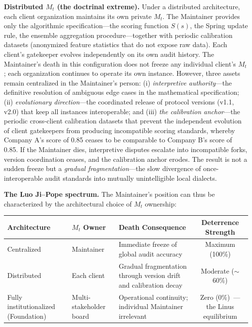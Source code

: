 \documentclass[12pt,a4paper]{ctexart}
\theoremstyle{definition}
\theoremstyle{remark}
\begin{document}
\textbf{Distributed $M_t$ (the doctrinal extreme).} Under a distributed architecture, each client organization maintains its own private $M_t$. The Maintainer provides only the algorithmic specification—the scoring function $S(s)$, the Spring update rule, the ensemble aggregation procedure—together with periodic calibration datasets (anonymized feature statistics that do not expose raw data). Each client's gatekeeper evolves independently on its own audit history. The Maintainer's death in this configuration does not freeze any individual client's $M_t$; each organization continues to operate its own instance. However, three assets remain centralized in the Maintainer's person: (i) \textit{interpretive authority}—the definitive resolution of ambiguous edge cases in the mathematical specification; (ii) \textit{evolutionary direction}—the coordinated release of protocol versions (v1.1, v2.0) that keep all instances interoperable; and (iii) \textit{the calibration anchor}—the periodic cross-client calibration datasets that prevent the independent evolution of client gatekeepers from producing incompatible scoring standards, whereby Company A's score of 0.85 ceases to be comparable to Company B's score of 0.85. If the Maintainer dies, interpretive disputes escalate into incompatible forks, version coordination ceases, and the calibration anchor erodes. The result is not a sudden freeze but a \textit{gradual fragmentation}—the slow divergence of once-interoperable audit standards into mutually unintelligible local dialects.

\textbf{The Luo Ji–Pope spectrum.} The Maintainer's position can thus be characterized by the architectural choice of $M_t$ ownership:

\begin{table}[htbp]
\centering
\begin{tabular}{@{}p{3cm}p{3cm}p{4cm}c@{}}
\toprule
Architecture & $M_t$ Owner & Death Consequence & Deterrence Strength \\
\midrule
Centralized & Maintainer & Immediate freeze of global audit accuracy & Maximum (100\%) \\
Distributed & Each client & Gradual fragmentation through version drift and calibration decay & Moderate ($\sim$60\%) \\
Fully institutionalized (Foundation) & Multi-stakeholder board & Operational continuity; individual Maintainer irrelevant & Zero (0\%)\ — the Linus equilibrium \\
\bottomrule
\end{tabular}
\end{table}
\end{document}
